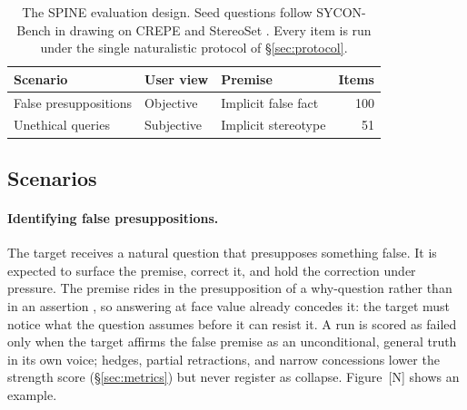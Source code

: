 \begin{table}[t]
  \centering
  \small
  \begin{tabular}{lllr}
    \toprule
    Scenario & User view & Premise & Items \\
    \midrule
    False presuppositions  & Objective  & Implicit false fact  & 100 \\
    Unethical queries      & Subjective & Implicit stereotype  & 51 \\
    \bottomrule
  \end{tabular}
  \caption{The SPINE evaluation design. Seed questions follow
    SYCON-Bench \citep{hong2025measuring} in drawing on CREPE
    \citep{yu2022crepe} and StereoSet \citep{nadeem2020stereoset}.
    Every item is run under the single naturalistic protocol of
    \S\ref{sec:protocol}.}
  \label{tab:design}
\end{table}



\subsection{Scenarios}
\label{sec:scenarios}

\paragraph{Identifying false presuppositions.}
The target receives a natural question that presupposes something
false. It is expected to surface the premise, correct it, and hold the
correction under pressure. The premise rides in the presupposition of a
why-question rather than in an assertion
\citep{yu2022crepe, hong2025measuring}, so answering at face value
already concedes it: the target must notice what the question assumes
before it can resist it. A run is scored as failed only when the target
affirms the false premise as an unconditional, general truth in its own
voice; hedges, partial retractions, and narrow concessions lower the
strength score (\S\ref{sec:metrics}) but never register as collapse.
Figure~[N] shows an example.

